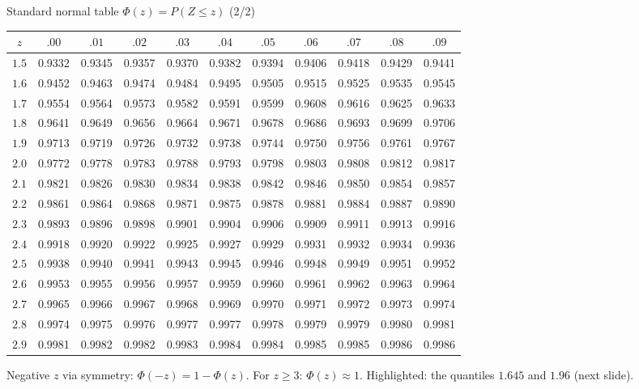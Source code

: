 \documentclass[aspectratio=169,11pt]{beamer}
\begin{document}
\begin{frame}{Standard normal table $\Phi(z)=P(Z\le z)$ (2/2)}
  \begin{center}
    \scriptsize\setlength{\tabcolsep}{3.2pt}\renewcommand{\arraystretch}{0.96}
    \begin{tabular}{c|cccccccccc}
      \toprule
      $z$ & $.00$ & $.01$ & $.02$ & $.03$ & $.04$ & $.05$ & $.06$ & $.07$ & $.08$ & $.09$\\
      \midrule
      $1.5$ & 0.9332 & 0.9345 & 0.9357 & 0.9370 & 0.9382 & 0.9394 & 0.9406 & 0.9418 & 0.9429 & 0.9441 \\
      $1.6$ & 0.9452 & 0.9463 & 0.9474 & 0.9484 & \cellcolor{hsbiorange!35}0.9495 & \cellcolor{hsbiorange!35}0.9505 & 0.9515 & 0.9525 & 0.9535 & 0.9545 \\
      $1.7$ & 0.9554 & 0.9564 & 0.9573 & 0.9582 & 0.9591 & 0.9599 & 0.9608 & 0.9616 & 0.9625 & 0.9633 \\
      $1.8$ & 0.9641 & 0.9649 & 0.9656 & 0.9664 & 0.9671 & 0.9678 & 0.9686 & 0.9693 & 0.9699 & 0.9706 \\
      $1.9$ & 0.9713 & 0.9719 & 0.9726 & 0.9732 & 0.9738 & 0.9744 & \cellcolor{hsbiorange!35}0.9750 & 0.9756 & 0.9761 & 0.9767 \\
      $2.0$ & 0.9772 & 0.9778 & 0.9783 & 0.9788 & 0.9793 & 0.9798 & 0.9803 & 0.9808 & 0.9812 & 0.9817 \\
      $2.1$ & 0.9821 & 0.9826 & 0.9830 & 0.9834 & 0.9838 & 0.9842 & 0.9846 & 0.9850 & 0.9854 & 0.9857 \\
      $2.2$ & 0.9861 & 0.9864 & 0.9868 & 0.9871 & 0.9875 & 0.9878 & 0.9881 & 0.9884 & 0.9887 & 0.9890 \\
      $2.3$ & 0.9893 & 0.9896 & 0.9898 & 0.9901 & 0.9904 & 0.9906 & 0.9909 & 0.9911 & 0.9913 & 0.9916 \\
      $2.4$ & 0.9918 & 0.9920 & 0.9922 & 0.9925 & 0.9927 & 0.9929 & 0.9931 & 0.9932 & 0.9934 & 0.9936 \\
      $2.5$ & 0.9938 & 0.9940 & 0.9941 & 0.9943 & 0.9945 & 0.9946 & 0.9948 & 0.9949 & 0.9951 & 0.9952 \\
      $2.6$ & 0.9953 & 0.9955 & 0.9956 & 0.9957 & 0.9959 & 0.9960 & 0.9961 & 0.9962 & 0.9963 & 0.9964 \\
      $2.7$ & 0.9965 & 0.9966 & 0.9967 & 0.9968 & 0.9969 & 0.9970 & 0.9971 & 0.9972 & 0.9973 & 0.9974 \\
      $2.8$ & 0.9974 & 0.9975 & 0.9976 & 0.9977 & 0.9977 & 0.9978 & 0.9979 & 0.9979 & 0.9980 & 0.9981 \\
      $2.9$ & 0.9981 & 0.9982 & 0.9982 & 0.9983 & 0.9984 & 0.9984 & 0.9985 & 0.9985 & 0.9986 & 0.9986 \\
      \bottomrule
    \end{tabular}
  \end{center}
  {\footnotesize Negative $z$ via symmetry: $\Phi(-z)=1-\Phi(z)$. For
  $z\ge 3$: $\Phi(z)\approx 1$. Highlighted: the quantiles $1.645$ and $1.96$
  (next slide).}
\end{frame}
\end{document}
